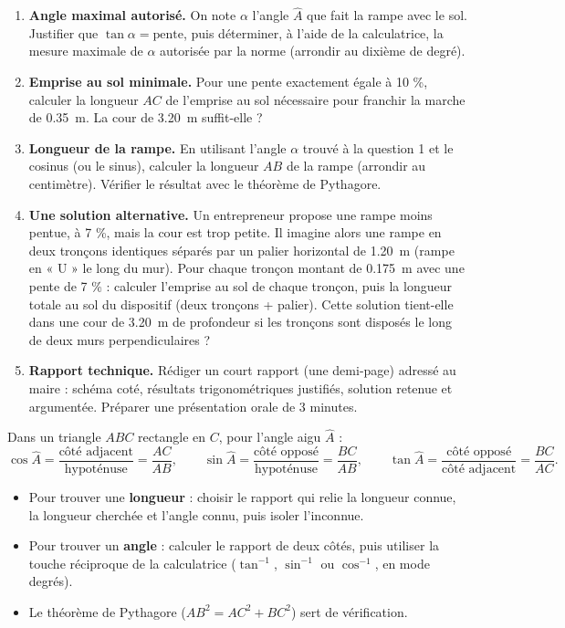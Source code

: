 \documentclass[11pt]{article}
\newcounter{popsec}
\newcounter{popsub}
\newcommand{\courssub}[1]{%
  \stepcounter{popsub}%
  \par\vspace{9pt}\noindent{\popxbold\fontsize{11.5}{13}\selectfont\color{popink}{\color{poporange}\thepopsec.\thepopsub}\hspace{6pt}#1}\par\nopagebreak\vspace{4pt}
}
\begin{document}
\begin{enumerate}
\item \textbf{Angle maximal autorisé.} On note $\alpha$ l'angle $\widehat{A}$ que fait la rampe avec le sol. Justifier que $\tan \alpha = \text{pente}$, puis déterminer, à l'aide de la calculatrice, la mesure maximale de $\alpha$ autorisée par la norme (arrondir au dixième de degré).
\item \textbf{Emprise au sol minimale.} Pour une pente exactement égale à 10 \%, calculer la longueur $AC$ de l'emprise au sol nécessaire pour franchir la marche de \SI{0,35}{m}. La cour de \SI{3,20}{m} suffit-elle ?
\item \textbf{Longueur de la rampe.} En utilisant l'angle $\alpha$ trouvé à la question 1 et le cosinus (ou le sinus), calculer la longueur $AB$ de la rampe (arrondir au centimètre). Vérifier le résultat avec le théorème de Pythagore.
\item \textbf{Une solution alternative.} Un entrepreneur propose une rampe moins pentue, à 7 \%, mais la cour est trop petite. Il imagine alors une rampe en deux tronçons identiques séparés par un palier horizontal de \SI{1,20}{m} (rampe en « U » le long du mur). Pour chaque tronçon montant de \SI{0,175}{m} avec une pente de 7 \% : calculer l'emprise au sol de chaque tronçon, puis la longueur totale au sol du dispositif (deux tronçons + palier). Cette solution tient-elle dans une cour de \SI{3,20}{m} de profondeur si les tronçons sont disposés le long de deux murs perpendiculaires ?
\item \textbf{Rapport technique.} Rédiger un court rapport (une demi-page) adressé au maire : schéma coté, résultats trigonométriques justifiés, solution retenue et argumentée. Préparer une présentation orale de 3 minutes.
\end{enumerate}

\courssub{Ressources à mobiliser}

\begin{aretenir}
Dans un triangle $ABC$ rectangle en $C$, pour l'angle aigu $\widehat{A}$ :
\[ \cos \widehat{A} = \dfrac{\text{côté adjacent}}{\text{hypoténuse}} = \dfrac{AC}{AB}, \qquad
\sin \widehat{A} = \dfrac{\text{côté opposé}}{\text{hypoténuse}} = \dfrac{BC}{AB}, \qquad
\tan \widehat{A} = \dfrac{\text{côté opposé}}{\text{côté adjacent}} = \dfrac{BC}{AC}. \]
\begin{itemize}
\item Pour trouver une \textbf{longueur} : choisir le rapport qui relie la longueur connue, la longueur cherchée et l'angle connu, puis isoler l'inconnue.
\item Pour trouver un \textbf{angle} : calculer le rapport de deux côtés, puis utiliser la touche réciproque de la calculatrice ($\tan^{-1}$, $\sin^{-1}$ ou $\cos^{-1}$, en mode degrés).
\item Le théorème de Pythagore ($AB^2 = AC^2 + BC^2$) sert de vérification.
\end{itemize}
\end{aretenir}
\end{document}
